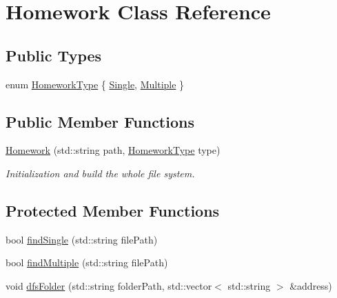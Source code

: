 \hypertarget{class_homework}{}\section{Homework Class Reference}
\label{class_homework}
\subsection*{Public Types}
\begin{DoxyCompactItemize}
\item 
enum \hyperlink{class_homework_a6509dc051b3763d7fea21b4557d3e79e}{Homework\+Type} \{ \hyperlink{class_homework_a6509dc051b3763d7fea21b4557d3e79ea36e19dfd1e533060c7fe573d957186b7}{Single}, 
\hyperlink{class_homework_a6509dc051b3763d7fea21b4557d3e79ea70ece26b542060114ccdffac5e147ee9}{Multiple}
 \}
\end{DoxyCompactItemize}
\subsection*{Public Member Functions}
\begin{DoxyCompactItemize}
\item 
\hyperlink{class_homework_aff55dea2a7a6958a7c05c1e843061f81}{Homework} (std\+::string path, \hyperlink{class_homework_a6509dc051b3763d7fea21b4557d3e79e}{Homework\+Type} type)
\begin{DoxyCompactList}\small\item\em Initialization and build the whole file system. \end{DoxyCompactList}\end{DoxyCompactItemize}
\subsection*{Protected Member Functions}
\begin{DoxyCompactItemize}
\item 
bool \hyperlink{class_homework_aab839a8b3d15dbf849b018e2295aecc2}{find\+Single} (std\+::string file\+Path)
\item 
bool \hyperlink{class_homework_aef97adc1d880c7aaf5870d70b05777c0}{find\+Multiple} (std\+::string file\+Path)
\item 
void \hyperlink{class_homework_ae7c7babeff4d2f82b9ac0b139e92701e}{dfs\+Folder} (std\+::string folder\+Path, std\+::vector$<$ std\+::string $>$ \&address)
\end{DoxyCompactItemize}
